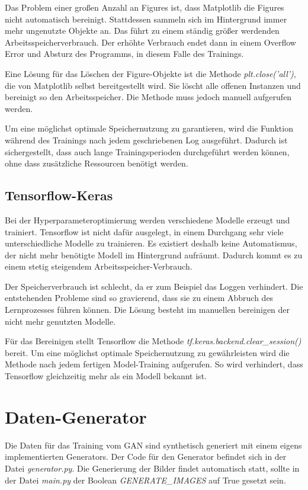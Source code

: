 Das Problem einer großen Anzahl an Figures ist, dass Matplotlib die Figures nicht automatisch bereinigt.
Stattdessen sammeln sich im Hintergrund immer mehr ungenutzte Objekte an.
Das führt zu einem ständig größer werdenden Arbeitsspeicherverbrauch.
Der erhöhte Verbrauch endet dann in einem Overflow Error und Absturz des Programms, in diesem Falle des Trainings.
\newline

Eine Lösung für das Löschen der Figure-Objekte ist die Methode \textit{plt.close('all')}, die von Matplotlib selbst bereitgestellt wird.
Sie löscht alle offenen Instanzen und bereinigt so den Arbeitsspeicher.
Die Methode muss jedoch manuell aufgerufen werden.
\newline

Um eine möglichst optimale Speichernutzung zu garantieren, wird die Funktion während des Trainings nach jedem geschriebenen Log ausgeführt.
Dadurch ist sichergestellt, dass auch lange Trainingsperioden durchgeführt werden können, ohne dass zusätzliche Ressourcen benötigt werden.

\subsection{Tensorflow-Keras}
Bei der Hyperparameteroptimierung werden verschiedene Modelle erzeugt und trainiert.
Tensorflow ist nicht dafür ausgelegt, in einem Durchgang sehr viele unterschiedliche Modelle zu trainieren.
Es existiert deshalb keine Automatismus, der nicht mehr benötigte Modell im Hintergrund aufräumt.
Dadurch kommt es zu einem stetig steigendem Arbeitsspeicher-Verbrauch.
\newline

Der Speicherverbrauch ist schlecht, da er zum Beispiel das Loggen verhindert.
Die entstehenden Probleme sind so gravierend, dass sie zu einem Abbruch des Lernprozesses führen können.
Die Lösung besteht im manuellen bereinigen der nicht mehr genutzten Modelle.
\newline

Für das Bereinigen stellt Tensorflow die Methode \textit{tf.keras.backend.clear\_session()} bereit.
Um eine möglichst optimale Speichernutzung zu gewährleisten wird die Methode nach jedem fertigen Model-Training aufgerufen.
So wird verhindert, dass Tensorflow gleichzeitig mehr als ein Modell bekannt ist.

\section{Daten-Generator}
Die Daten für das Training vom GAN sind synthetisch generiert mit einem eigens implementierten Generators.
Der Code für den Generator befindet sich in der Datei \textit{generator.py}.
Die Generierung der Bilder findet automatisch statt, sollte in der Datei \textit{main.py} der Boolean \textit{GENERATE\_IMAGES} auf True gesetzt sein.
\newline

